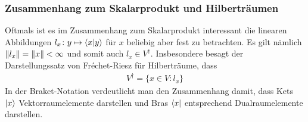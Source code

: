 \documentclass[12pt]{article}
\begin{document}
\subsubsection*{Zusammenhang zum Skalarprodukt und Hilberträumen}
Oftmals ist es im Zusammenhang zum Skalarprodukt interessant die linearen Abbildungen $l_x\colon y \mapsto \braket{x}{y}$ für $x$ beliebig aber fest zu betrachten. Es gilt nämlich $\norm{l_x} = \norm{x} < \infty$ und somit auch $l_x \in V^\dagger$. Insbesondere besagt der Darstellungssatz von Fréchet-Riesz für Hilberträume, dass
\begin{align}
V^\dagger = \big\{ x \in V\colon l_x \big\}
\end{align}
In der Braket-Notation verdeutlicht man den Zusammenhang damit, dass Kets $\ket x$ Vektorraumelemente darstellen und Bras $\bra x$ entsprechend Dualraumelemente darstellen.
\end{document}
